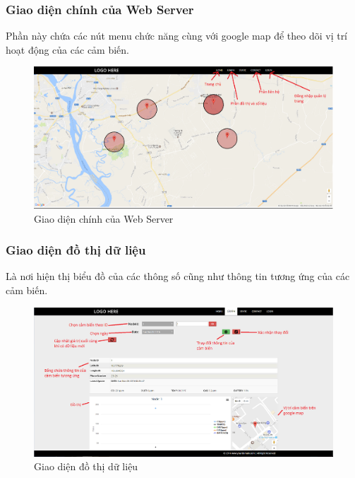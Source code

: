 \subsubsection*{Giao diện chính của Web Server}
Phần này chứa các nút menu chức năng cùng với google map để theo dõi vị trí hoạt động của các cảm biến.
\begin{center}
\begin{figure}[htp]
\centering    
\includegraphics[width=1\textwidth]{webserver}
\caption[Giao diện chính của Web Server]{Giao diện chính của Web Server}
\label{fig:webserver}
\end{figure}
\end{center}

\subsubsection*{Giao diện đồ thị dữ liệu}
Là nơi hiện thị biểu đồ của các thông số cũng như thông tin tương ứng của các cảm biến.
\begin{center}
\begin{figure}[htp]
\centering    
\includegraphics[width=1\textwidth]{web_graph}
\caption[Giao diện đồ thị dữ liệu]{Giao diện đồ thị dữ liệu}
\label{fig:web_graph}
\end{figure}
\end{center}



